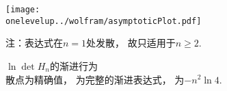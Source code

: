 \documentclass[preview,10pt,border=8pt]{standalone}
\begin{document}
\begin{figure}[!t]
	\centering
	\hspace{2em}\texttt{[image: \\onelevelup../wolfram/asymptoticPlot.pdf]}
	\caption*{$\ln\det H_n$的渐进行为\\
		散点为精确值， 为完整的渐进表达式，
			 为$- n^2 \ln 4$. 
	}
	\itshape
	
	注：表达式在$n = 1$处发散，
		故只适用于$n \ge 2$. 
\end{figure}
\end{document}
